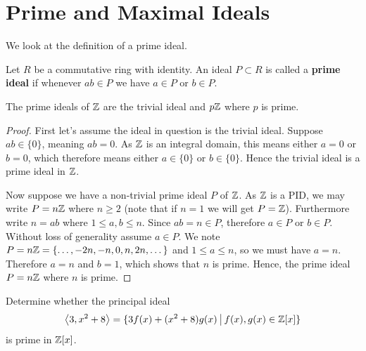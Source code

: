 \section{Prime and Maximal Ideals}
We look at the definition of a prime ideal.
\begin{definition}
    Let $R$ be a commutative ring with identity. An ideal $P \subset R$ is called a \textbf{prime ideal} if whenever $ab \in P$ we have $a \in P$ or $b \in P$.
\end{definition}
\begin{proposition}
    The prime ideals of $\mathbb{Z}$ are the trivial ideal and $p\mathbb{Z}$ where $p$ is prime.
\end{proposition}
\begin{proof}
    First let's assume the ideal in question is the trivial ideal. Suppose $ab \in \{0\}$, meaning $ab = 0$. As $\mathbb{Z}$ is an integral domain, this means either $a = 0$ or $b = 0$, which therefore means either $a \in \{0\}$ or $b \in \{0\}$. Hence the trivial ideal is a prime ideal in $\mathbb{Z}$.

    Now suppose we have a non-trivial prime ideal $P$ of $\mathbb{Z}$. As $\mathbb{Z}$ is a PID, we may write $P = n\mathbb{Z}$ where $n \geq 2$ (note that if $n = 1$ we will get $P = \mathbb{Z}$). Furthermore write $n = ab$ where $1 \leq a,b \leq n$. Since $ab = n \in P$, therefore $a \in P$ or $b \in P$. Without loss of generality assume $a \in P$. We note $P = n\mathbb{Z} = \{\dots, -2n, -n, 0, n, 2n, \dots\}$ and $1 \leq a \leq n$, so we must have $a = n$. Therefore $a = n$ and $b = 1$, which shows that $n$ is prime. Hence, the prime ideal $P = n\mathbb{Z}$ where $n$ is prime.
\end{proof}
\begin{exercise}
    Determine whether the principal ideal
    \[
        \princ{3, x^2 + 8} = \{3f(x) + (x^2+8)g(x) \vert f(x),g(x) \in \Z[x]\}
    \]
    is prime in $\mathbb{Z}[x]$.
\end{exercise}

\newpage

